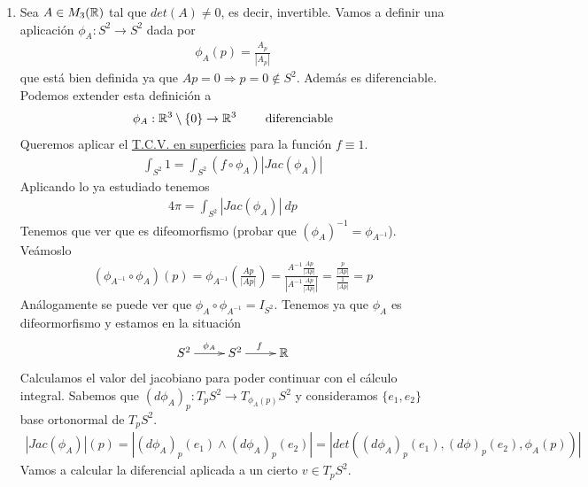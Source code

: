 \begin{ejemplo}
\begin{enumerate}
        \item Sea $A\in M_3(\mathbb{R})$ tal que $det(A)\neq 0$, es decir, invertible. Vamos a definir una aplicación $\phi_A : S^2 \to S^2$ dada por
        \begin{gather*}
            \phi_A(p) = \frac{A_p}{|A_p|}
        \end{gather*}
        que está bien definida ya que $Ap=0\Rightarrow p=0\notin S^2$. Además es diferenciable. Podemos extender esta definición a 
        \begin{gather*}
            \phi_A : \mathbb{R}^3 \setminus \{0\} \to \mathbb{R}^3 \qquad \text{ diferenciable}
        \end{gather*}
        Queremos aplicar el \hyperref[teo:cambio_variable_integral_sup]{T.C.V. en superficies} para la función $f\equiv 1$.
        \begin{gather*}
            \int_{S^2} 1 = \int_{S^2} (f \circ \phi_A) |Jac(\phi_A)|
        \end{gather*}
        Aplicando lo ya estudiado tenemos
        \begin{gather*}
            4\pi = \int_{S^2} |Jac(\phi_A)|\ dp
        \end{gather*}
        Tenemos que ver que es difeomorfismo (probar que $(\phi_A)^{-1} = \phi_{A^{-1}}$). Veámoslo
        \begin{gather*}
            (\phi_{A^{-1}} \circ \phi_A)(p) = 
            \phi_{A^{-1}} \left(\frac{Ap}{|Ap|}\right) = \frac{A^{-1} \frac{Ap}{|Ap|}}{\left|A^{-1} \frac{Ap}{|Ap|}\right|} = \frac{\frac{p}{|Ap|}}{\frac{1}{|Ap|}} = p
        \end{gather*}
        Análogamente se puede ver que $\phi_A \circ \phi_{A^{-1}}=I_{S^2}$. Tenemos ya que $\phi_A$ es difeormorfismo y estamos en la situación
        \begin{gather*}
            \xymatrix{
                S^2 \ar[r]^{\phi_A} & S^2 \ar[r]^f & \bb{R}
            }
        \end{gather*}
        Calculamos el valor del jacobiano para poder continuar con el cálculo integral. Sabemos que $(d\phi_A)_p : T_pS^2 \to T_{\phi_A(p)}S^2$ y consideramos $\{e_1, e_2\}$ base ortonormal de $T_pS^2$.
        \begin{gather*}
            |Jac(\phi_A)|(p) = 
            |(d\phi_A)_p(e_1) \wedge (d\phi_A)_p(e_2)| = 
            |det((d\phi_A)_p(e_1), (d\phi)_p(e_2), \phi_A(p))|
        \end{gather*}
        Vamos a calcular la diferencial aplicada a un cierto $v\in T_pS^2$.

\end{enumerate}
\end{ejemplo}
